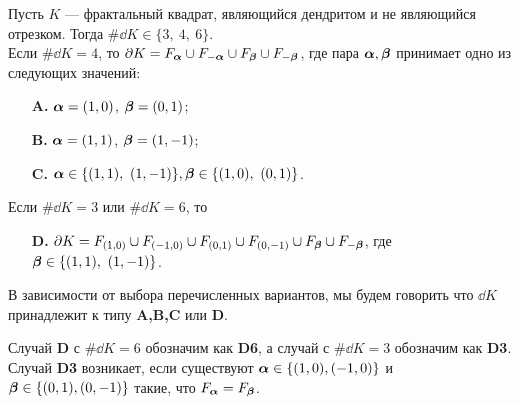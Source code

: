 \begin{theorem}\label{ssboundary}
% 
Пусть $K$ --- фрактальный квадрат, являющийся дендритом и не являющийся отрезком.
Тогда $\#\dd K\in\{3,\ 4,\ 6\}$. \\
 Если $\#\dd K=4$, то  $\partial K=F_{\bm{\alpha}}\cup F_{-{\bm{\alpha}}}\cup F_{\bm{\beta}}\cup F_{-{\bm{\beta}}}$, где   пара  ${\bm{\alpha}},{\bm{\beta}}$ принимает одно из следующих значений:
	\begin{itemize}
	\item[{\bf A.}] ${\bm{\alpha}}=(1,0)$, $ {\bm{\beta}}=(0,1)$;
	\item[{\bf B.}] ${\bm{\alpha}}=(1,1)$, $ {\bm{\beta}}=(1,-1)$;
	\item[{\bf C.}] $\bma\in\{(1,1),\ (1,-1)\},\bmb\in\{(1,0),\ (0,1)\}$.
	\end{itemize}
 Если $\#\dd K=3$ или $\#\dd K=6$, то %
\begin{itemize}
	\item[{\bf D.}] $\partial K=F_{(1,0)}\cup F_{(-1,0)}\cup F_{(0,1)}\cup F_{(0,-1)}\cup F_{\bm{\beta}}\cup F_{-{\bm{\beta}}}$, где ${\bm{\beta}}\in\{(1,1),\ (1,-1)\}$.
	\end{itemize}
\end{theorem}

В зависимости от выбора перечисленных  вариантов, мы будем говорить что $\dd K$ принадлежит к типу {\bf A,B,C} или {\bf D}.

\begin{remark}
Случай {\bf D} с $\#\dd K=6$ обозначим как {\bf D6}, а случай с $\#\dd K=3$ обозначим как {\bf D3}.
Случай {\bf D3} возникает, если существуют ${\bm{\alpha}}\in\{(1,0),(-1,0)\}$ и ${\bm{\beta}}\in\{(0,1),(0,-1)\}$ такие, что $F_{\bm{\alpha}}=F_{\bm{\beta}}$.
\end{remark}

